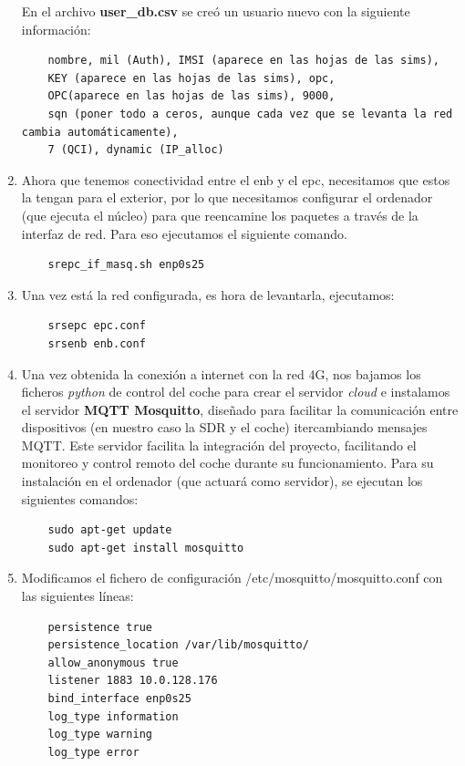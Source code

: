 \begin{enumerate}
En el archivo \textbf{user_db.csv} se creó un usuario nuevo con la siguiente información:
\begin{lstlisting}
    nombre, mil (Auth), IMSI (aparece en las hojas de las sims),
    KEY (aparece en las hojas de las sims), opc,
    OPC(aparece en las hojas de las sims), 9000,
    sqn (poner todo a ceros, aunque cada vez que se levanta la red cambia automáticamente),
    7 (QCI), dynamic (IP_alloc)
\end{lstlisting}

\item Ahora que tenemos conectividad entre el enb y el epc, necesitamos que estos la tengan para el exterior, por lo que necesitamos configurar el ordenador (que ejecuta el núcleo) para que reencamine los paquetes a través de la interfaz de red. Para eso ejecutamos el siguiente comando.

\begin{lstlisting}
    srepc_if_masq.sh enp0s25
\end{lstlisting}

\item Una vez está la red configurada, es hora de levantarla, ejecutamos:
\begin{lstlisting}
    srsepc epc.conf
    srsenb enb.conf
\end{lstlisting}

\item Una vez obtenida la conexión a internet con la red 4G, nos bajamos los ficheros \textit{python} de control del coche para crear el servidor \textit{cloud} e instalamos el servidor \textbf{MQTT Mosquitto}, diseñado para facilitar la comunicación entre dispositivos (en nuestro caso la SDR y el coche) itercambiando mensajes MQTT. Este servidor facilita la integración del proyecto, facilitando el monitoreo y control remoto del coche durante su funcionamiento.
Para su instalación en el ordenador (que actuará como servidor), se ejecutan los siguientes comandos:

\begin{lstlisting}
	sudo apt-get update
	sudo apt-get install mosquitto
\end{lstlisting}

\item Modificamos el fichero de configuración /etc/mosquitto/mosquitto.conf con las siguientes líneas:
\begin{lstlisting}
	persistence true
	persistence_location /var/lib/mosquitto/
	allow_anonymous true
	listener 1883 10.0.128.176
	bind_interface enp0s25
	log_type information
	log_type warning
	log_type error
\end{lstlisting}


\end{enumerate}
